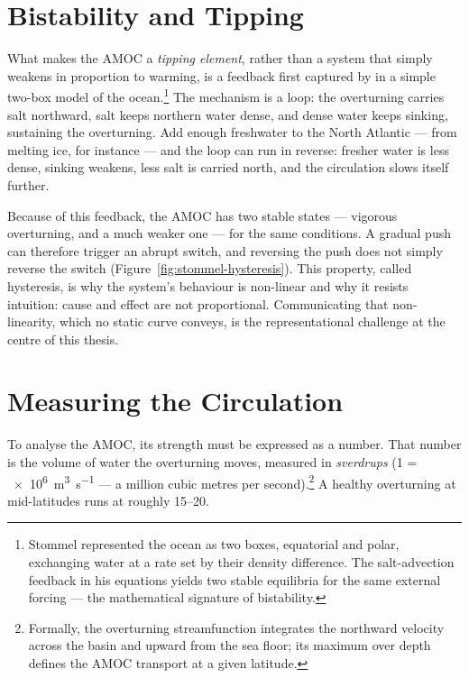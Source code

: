 \section{Bistability and Tipping}
\label{sec:bg-bistability}

What makes the AMOC a \emph{tipping element}, rather than a system that simply weakens in proportion to warming, is a feedback first captured by \citet{stommel1961} in a simple two-box model of the ocean.\footnote{Stommel represented the ocean as two boxes, equatorial and polar, exchanging water at a rate set by their density difference. The salt-advection feedback in his equations yields two stable equilibria for the same external forcing --- the mathematical signature of bistability.} The mechanism is a loop: the overturning carries salt northward, salt keeps northern water dense, and dense water keeps sinking, sustaining the overturning. Add enough freshwater to the North Atlantic --- from melting ice, for instance --- and the loop can run in reverse: fresher water is less dense, sinking weakens, less salt is carried north, and the circulation slows itself further.

Because of this feedback, the AMOC has two stable states --- vigorous overturning, and a much weaker one --- for the same conditions. A gradual push can therefore trigger an abrupt switch, and reversing the push does not simply reverse the switch (Figure~\ref{fig:stommel-hysteresis}). This property, called hysteresis, is why the system's behaviour is non-linear and why it resists intuition: cause and effect are not proportional. Communicating that non-linearity, which no static curve conveys, is the representational challenge at the centre of this thesis.

\section{Measuring the Circulation}
\label{sec:bg-measurement}

To analyse the AMOC, its strength must be expressed as a number. That number is the volume of water the overturning moves, measured in \emph{sverdrups} (\SI{1}{\sverdrup} = \SI{e6}{\cubic\metre\per\second} --- a million cubic metres per second).\footnote{Formally, the overturning streamfunction integrates the northward velocity across the basin and upward from the sea floor; its maximum over depth defines the AMOC transport at a given latitude.} A healthy overturning at mid-latitudes runs at roughly \SI{15}{}--\SI{20}{\sverdrup}.

